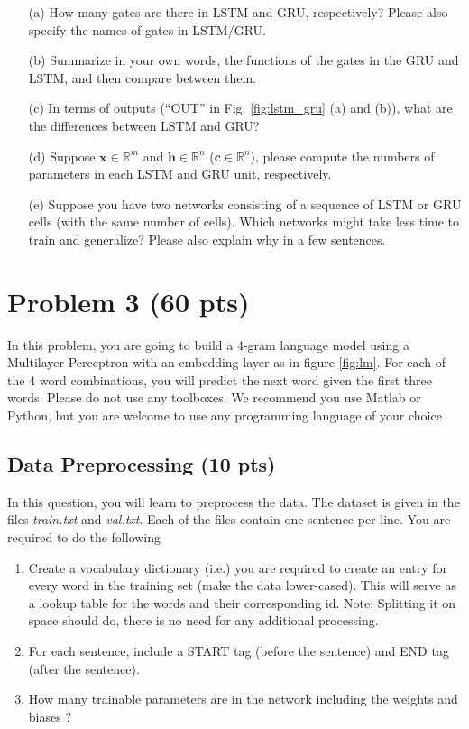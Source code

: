 \documentclass[10pt]{article}
\begin{document}
\begin{itemize}
\item[(a)] How many gates are there in LSTM and GRU, respectively? Please also specify the names of gates in LSTM/GRU.
\item[(b)] Summarize in your own words, the functions of the gates in the GRU and LSTM, and then compare between them. 
\item[(c)] In terms of outputs (``OUT'' in Fig. \ref{fig:lstm_gru} (a) and (b)), what are the differences between LSTM and GRU? 
\item[(d)] Suppose $\mathbf{x}\in \mathbb{R}^m$ and $\mathbf{h} \in \mathbb{R}^n$ ($\mathbf{c} \in \mathbb{R}^n$), please compute the numbers of parameters in each LSTM and GRU unit, respectively.
\item[(e)] Suppose you have two networks consisting of a sequence of LSTM or GRU cells (with the same number of cells). Which networks might take less time to train and generalize? Please also explain why in a few sentences. 
\end{itemize}



\section{Problem 3 (60 pts)}

 In this problem, you are going to build a 4-gram language model using a Multilayer Perceptron with an embedding layer as in figure \ref{fig:lm}. For each of the 4 word combinations, you will predict the next word given the first three words. Please do not use any toolboxes. We recommend you use Matlab or Python, but you are welcome to use any programming language of your choice

\subsection{Data Preprocessing (10 pts)}
In this question, you will learn to preprocess the data. The dataset is given in the files \emph{train.txt} and \emph{val.txt}. Each of the files contain one sentence per line. You are required to do the following


\begin{enumerate}
\item Create a vocabulary dictionary (i.e.) you are required to create an entry for every word in the training set (make the data lower-cased). This will serve as a lookup table for the words and their corresponding id. Note: Splitting it on space should do, there is no need for any additional processing. 
\item For each sentence, include a START tag (before the sentence) and END tag (after the sentence). 
\item How many trainable parameters are in the network including the weights and biases ?
\end{enumerate}
\end{document}
